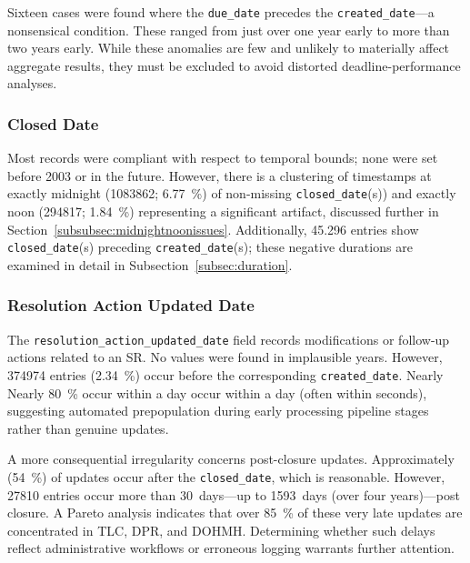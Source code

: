 \documentclass[linenumber]{jdsart}
\newcommand{\numint}[1]{\num[round-mode=none]{#1}}
\begin{document}
Sixteen cases were found where the \texttt{due\_date} precedes the
\texttt{created\_date}—a nonsensical condition. These ranged from just over
one year early to more than two years early. While these anomalies are few and
unlikely to materially affect aggregate results, they must be excluded to
avoid distorted deadline-performance analyses.

\subsubsection{Closed Date}
\label{subsubsec:closeddate}
Most records were compliant with respect to temporal bounds; none were set
before 2003 or in the future. However, there is a clustering of 
timestamps at exactly 
midnight (\numint{1083862}; \SI[round-precision = 2]{6.77}{\percent}) 
of non-missing \texttt{closed\_date}(s)) and exactly noon
(\numint{294817}; \SI[round-precision = 2]{1.84}{\percent}) representing
 a significant artifact, discussed further in
Section~\ref{subsubsec:midnightnoonissues}. Additionally, \numint{45,296} entries
show \texttt{closed\_date}(s) preceding \texttt{created\_date}(s); these
negative durations are examined in detail in
Subsection~\ref{subsec:duration}.

\subsubsection{Resolution Action Updated Date}
\label{subsubsec:resolutionupdatedate}
The \texttt{resolution\_action\_updated\_date} field records modifications or
follow-up actions related to an SR. No values were found in implausible years.
However, \numint{374974} entries
(\SI[round-precision = 2]{2.34}{\percent}) occur before the corresponding
\texttt{created\_date}. Nearly Nearly \SI[round-precision=0]{80}{\percent} occur within a day occur within a day (often
within seconds), suggesting automated prepopulation during early processing
pipeline stages rather than genuine updates.

A more consequential irregularity concerns post-closure updates.
Approximately (\SI[round-precision=0]{54}{\percent}) of updates occur after the
\texttt{closed\_date}, which is reasonable. However, \numint{27810} entries occur
more than 30~days—up to \numint{1593}~days (over four years)—post closure. A Pareto
analysis indicates that over \SI[round-precision=0]{85}{\percent} of these very 
late updates are concentrated in TLC, DPR, and DOHMH. Determining 
whether such delays reflect administrative workflows or 
erroneous logging warrants further attention.
\end{document}
